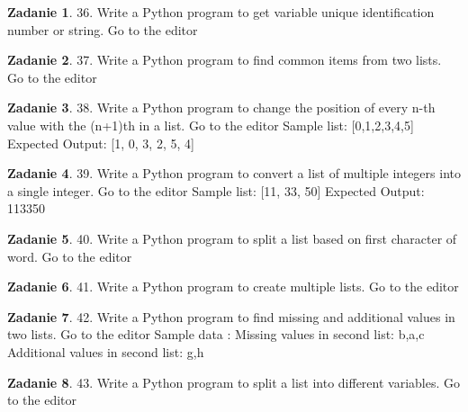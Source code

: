 \documentclass[11pt]{article}
\theoremstyle{definition}
\newtheorem{zadanie}{Zadanie}
\begin{document}
\begin{zadanie}


36. Write a Python program to get variable unique identification number or string. Go to the editor


\end{zadanie}

\begin{zadanie}


37. Write a Python program to find common items from two lists. Go to the editor


\end{zadanie}

\begin{zadanie}


38. Write a Python program to change the position of every n-th value with the (n+1)th in a list. Go to the editor
Sample list: [0,1,2,3,4,5]
Expected Output: [1, 0, 3, 2, 5, 4]


\end{zadanie}

\begin{zadanie}


39. Write a Python program to convert a list of multiple integers into a single integer. Go to the editor
Sample list: [11, 33, 50]
Expected Output: 113350


\end{zadanie}

\begin{zadanie}


40. Write a Python program to split a list based on first character of word. Go to the editor


\end{zadanie}

\begin{zadanie}


41. Write a Python program to create multiple lists. Go to the editor


\end{zadanie}

\begin{zadanie}


42. Write a Python program to find missing and additional values in two lists. Go to the editor
Sample data : Missing values in second list: b,a,c
Additional values in second list: g,h


\end{zadanie}

\begin{zadanie}


43. Write a Python program to split a list into different variables. Go to the editor


\end{zadanie}
\end{document}
